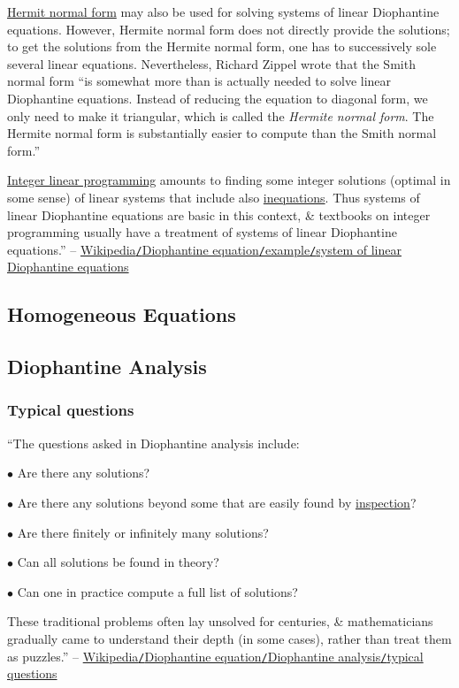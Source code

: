 \documentclass{article}
\numberwithin{equation}{section}
\begin{document}
\href{https://en.wikipedia.org/wiki/Hermite_normal_form}{Hermit normal form} may also be used for solving systems of linear Diophantine equations. However, Hermite normal form does not directly provide the solutions; to get the solutions from the Hermite normal form, one has to successively sole several linear equations. Nevertheless, Richard Zippel wrote that the Smith normal form ``is somewhat more than is actually needed to solve linear Diophantine equations. Instead of reducing the equation to diagonal form, we only need to make it triangular, which is called the \textit{Hermite normal form}. The Hermite normal form is substantially easier to compute than the Smith normal form.''

\href{https://en.wikipedia.org/wiki/Integer_linear_programming}{Integer linear programming} amounts to finding some integer solutions (optimal in some sense) of linear systems that include also \href{https://en.wikipedia.org/wiki/Inequation}{inequations}. Thus systems of linear Diophantine equations are basic in this context, \& textbooks on integer programming usually have a treatment of systems of linear Diophantine equations.'' -- \href{https://en.wikipedia.org/wiki/Diophantine_equation#System_of_linear_Diophantine_equations}{Wikipedia\texttt{/}Diophantine equation\texttt{/}example\texttt{/}system of linear Diophantine equations}

\subsection{Homogeneous Equations}

\subsection{Diophantine Analysis}

\subsubsection{Typical questions}
``The questions asked in Diophantine analysis include:
\begin{enumerate*}
	\item[$\bullet$] Are there any solutions?
	\item[$\bullet$] Are there any solutions beyond some that are easily found by \href{https://en.wikipedia.org/wiki/List_of_mathematical_jargon#Proof_techniques}{inspection}?
	\item[$\bullet$] Are there finitely or infinitely many solutions?
	\item[$\bullet$] Can all solutions be found in theory?
	\item[$\bullet$] Can one in practice compute a full list of solutions?
\end{enumerate*}
These traditional problems often lay unsolved for centuries, \& mathematicians gradually came to understand their depth (in some cases), rather than treat them as puzzles.'' -- \href{https://en.wikipedia.org/wiki/Diophantine_equation#Typical_questions}{Wikipedia\texttt{/}Diophantine equation\texttt{/}Diophantine analysis\texttt{/}typical questions}
\end{document}
